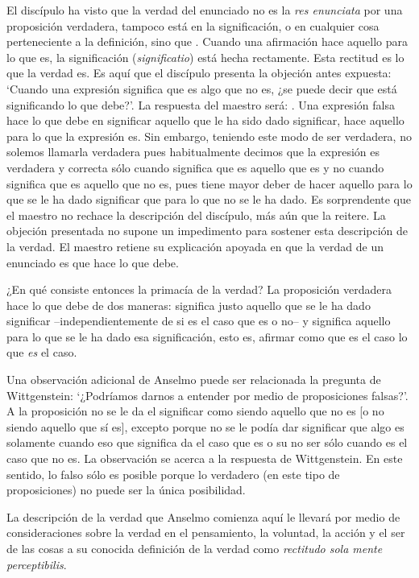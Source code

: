 El discípulo ha visto que la verdad del enunciado no es la \emph{res enunciata}
por una proposición verdadera, tampoco está en la significación, o en cualquier
cosa perteneciente a la definición, sino que .
Cuando una afirmación hace aquello para lo que es, la significación
(\emph{significatio}) está hecha rectamente. Esta rectitud es lo que la verdad
es. Es aquí que el discípulo presenta la objeción antes expuesta: `Cuando una
expresión significa que es algo que no es, ¿se puede decir que está significando
lo que debe?'. La respuesta del maestro será: . Una expresión falsa hace lo que
debe en significar aquello que le ha sido dado significar, hace aquello para lo
que la expresión es. Sin embargo, teniendo este modo de ser verdadera, no
solemos llamarla verdadera pues habitualmente decimos que la expresión es
verdadera y correcta sólo cuando significa que es aquello que es y no cuando
significa que es aquello que no es, pues tiene mayor deber de hacer aquello para
lo que se le ha dado significar que para lo que no se le ha dado. Es
sorprendente que el maestro no rechace la descripción del discípulo, más aún que
la reitere. La objeción presentada no supone un impedimento para sostener esta
descripción de la verdad. El maestro retiene su explicación apoyada en que la
verdad de un enunciado es que hace lo que debe.

¿En qué consiste entonces la primacía de la verdad? La proposición verdadera
hace lo que debe de dos maneras: significa justo aquello que se le ha dado
significar --independientemente de si es el caso que es o no-- y significa
aquello para lo que se le ha dado esa significación, esto es, afirmar como que
es el caso lo que \emph{es} el caso.

Una observación adicional de Anselmo puede ser relacionada la pregunta de
Wittgenstein: `¿Podríamos darnos a entender por medio de proposiciones falsas?'.
A la proposición no se le da el significar como siendo aquello que no es [o no
siendo aquello que sí es], excepto porque no se le podía dar significar que algo
es solamente cuando eso que significa da el caso que es o su no ser sólo cuando
es el caso que no es. La observación se acerca a la respuesta de Wittgenstein.
En este sentido, lo falso sólo es posible porque lo verdadero (en este tipo de
proposiciones) no puede ser la única posibilidad.

La descripción de la verdad que Anselmo comienza aquí le llevará por medio de
consideraciones sobre la verdad en el pensamiento, la voluntad, la acción y el
ser de las cosas a su conocida definición de la verdad como \emph{rectitudo sola
  mente perceptibilis}.
